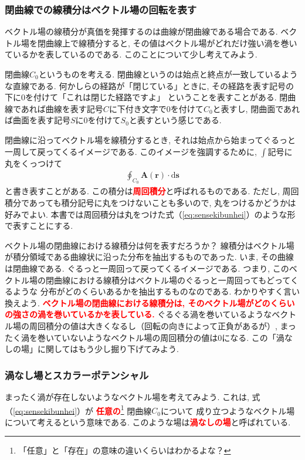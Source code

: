\subsubsection{閉曲線での線積分はベクトル場の回転を表す}
ベクトル場の線積分が真価を発揮するのは曲線が閉曲線である場合である. 
ベクトル場を閉曲線上で線積分すると, その値はベクトル場がどれだけ強い渦を巻いているかを表しているのである. 
このことについて少し考えてみよう. 

閉曲線$C_0$というものを考える. 閉曲線というのは始点と終点が一致しているような直線である. 
何かしらの経路が「閉じている」ときに, その経路を表す記号の下に0を付けて「これは閉じた経路ですよ」
ということを表すことがある. 閉曲線であれば曲線を表す記号$C$に下付き文字で0を付けて$C_0$と表すし, 
閉曲面であれば曲面を表す記号$S$に0を付けて$S_0$と表すという感じである. 

閉曲線に沿ってベクトル場を線積分するとき, それは始点から始まってぐるっと一周して戻ってくるイメージである. 
このイメージを強調するために, $\int$記号に丸をくっつけて
\begin{eqnarray}
\oint_{C_0}^{} \bm{A}(\bm{r}) \cdot \mathrm{d} \bm{s} 
\label{eq:sensekibunhei}
\end{eqnarray}
と書き表すことがある. この積分は\textbf{\textcolor{red}{周回積分}}と呼ばれるものである. 
ただし, 周回積分であっても積分記号に丸をつけないことも多いので, 丸をつけるかどうかは好みでよい. 
本書では周回積分は丸をつけた式（\ref{eq:sensekibunhei}）のような形で表すことにする. 

ベクトル場の閉曲線における線積分は何を表すだろうか？ 
線積分はベクトル場が積分領域である曲線状に沿った分布を抽出するものであった. 
いま, その曲線は閉曲線である. ぐるっと一周回って戻ってくるイメージである. 
つまり, このベクトル場の閉曲線における線積分はベクトル場のぐるっと一周回ってもどってくるような
分布がどのくらいあるかを抽出するものなのである. 
わかりやすく言い換えよう. 
\textbf{\textcolor{red}{ベクトル場の閉曲線における線積分は, そのベクトル場がどのくらいの強さの渦を巻いているかを表している.}}
ぐるぐる渦を巻いているようなベクトル場の周回積分の値は大きくなるし（回転の向きによって正負があるが）, 
まったく渦を巻いていないようなベクトル場の周回積分の値は0になる. 
この「渦なしの場」に関してはもう少し掘り下げてみよう. 

\subsubsection{渦なし場とスカラーポテンシャル}
まったく渦が存在しないようなベクトル場を考えてみよう. 
これは, 式（\ref{eq:sensekibunhei}）が
\textbf{\textcolor{red}{任意の}}\footnote{「任意」と「存在」の意味の違いくらいはわかるよな？} 閉曲線$C_0$について
成り立つようなベクトル場について考えるという意味である. 
このような場は\textbf{\textcolor{red}{渦なしの場}}と呼ばれている. 

